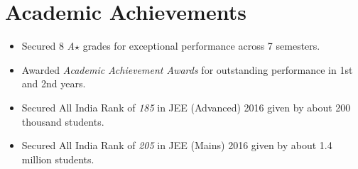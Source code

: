 \section*{Academic Achievements}
\begin{itemize}

\setlength\itemsep{0pt}
\item Secured 8 \textit{A$\star$} grades for exceptional performance across 7 semesters.
\item Awarded \textit{Academic Achievement Awards} for outstanding performance in 1st and 2nd years.
\item Secured All India Rank of \textit{185} in JEE (Advanced) 2016 given by about 200 thousand students.
\item Secured All India Rank of \textit{205} in JEE (Mains) 2016 given by about 1.4 million students.

\end{itemize}
